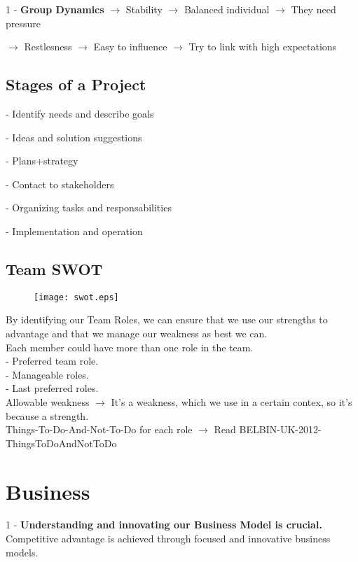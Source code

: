 \documentclass[11pt,a4paper]{article}
\begin{document}
1 - \textbf{Group Dynamics} $\to$ Stability $\to$ Balanced individual $\to$ They need pressure

\hspace{3.9cm} $\to$ Restlesness $\to$ Easy to influence $\to$ Try to link with high expectations

\subsection{Stages of a Project}
- Identify needs and describe goals

- Ideas and solution suggestions

- Plans+strategy

- Contact to stakeholders

- Organizing tasks and responsabilities

- Implementation and operation

\subsection{Team SWOT}
\begin{figure}[hbtp]
\begin{center}
\texttt{[image: swot.eps]}
\end{center}
\end{figure}
By identifying our Team Roles, we can ensure that we use our strengths to advantage and that we manage our weakness as best we can. \\

Each member could have more than one role in the team. \\
\hspace{10cm} - Preferred team role.\\
\hspace{10cm} - Manageable roles. \\
\hspace{10cm} - Last preferred roles. \\

Allowable weakness $\to$ It's a weakness, which we use in a certain contex, so it's because a strength.\\

Things-To-Do-And-Not-To-Do for each role $\to$ Read BELBIN-UK-2012-ThingsToDoAndNotToDo\\

\section{Business}
1 - \textbf{Understanding and innovating our Business Model is crucial.} Competitive advantage is achieved through focused and innovative business models.\\
\end{document}
